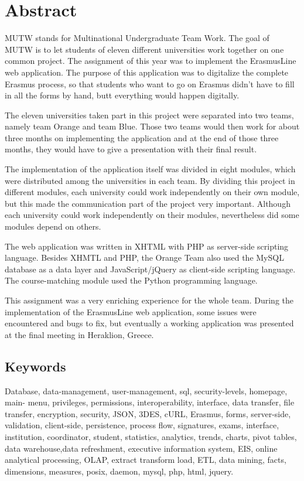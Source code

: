 \chapter*{Abstract}
MUTW stands for Multinational Undergraduate Team Work. The
goal of MUTW is to let students of eleven different universities work together on one common project. The assignment of this year was to implement the ErasmusLine web application. The purpose of this application was to digitalize the complete Erasmus process, so that students who want to go on Erasmus didn’t have to fill in all the forms by hand, butt everything would happen digitally.


The eleven universities taken part in this project were separated into
two teams, namely team Orange and team Blue. Those two teams would then work for about three months on implementing the application and at the end of those three months, they would have to give a presentation with their final result.


The implementation of the application itself was divided in eight
modules, which were distributed among the universities in each team. By dividing this project in different modules, each university could work independently on their own module, but this made the communication part of the project very important. Although each university could work independently on their modules, nevertheless did some modules depend on others.


The web application was written in XHTML with PHP as server-side
scripting language. Besides XHMTL and PHP, the Orange Team also used the MySQL
database as a data layer and JavaScript/jQuery as client-side scripting
language. The course-matching module used the Python programming language. 

 
This assignment was a very enriching experience for the whole team.
During the implementation of the ErasmusLine web application, some issues were
encountered and bugs to fix, but eventually a working application was presented
at the final meeting in Heraklion, Greece.

\section*{Keywords}
Database, data-management, user-management, sql, security-levels, homepage,
main- menu, privileges, permissions, interoperability, interface, data transfer,
file transfer, encryption, security, JSON, 3DES, cURL, Erasmus, forms,
server-side, validation, client-side, persistence, process
flow, signatures, exams, interface, institution, coordinator, student,
statistics, analytics, trends, charts, pivot tables, data warehouse,data
refreshment, executive information system, EIS, online analytical processing,
OLAP, extract transform load, ETL, data mining, facts, dimensions, measures,
posix, daemon, mysql, php, html, jquery.
